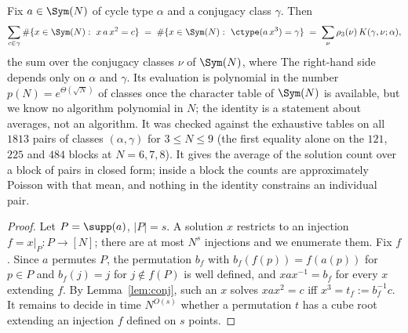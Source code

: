\begin{thm}\label{thm:firstmoment}\label{prop:moment}
Fix $a\in\Sym(N)$ of cycle type $\alpha$ and a conjugacy class $\gamma$. Then
\[ \sum_{c\in\gamma}\#\{x\in\Sym(N):\ x\,a\,x^{2}=c\}\;=\;\#\{x\in\Sym(N):\ \ctype(a\,x^{3})=\gamma\}\;=\;\sum_{\nu}\rho_3(\nu)\,K(\gamma,\nu;\alpha), \]
the sum over the conjugacy classes $\nu$ of $\Sym(N)$, where
The right-hand side depends only on $\alpha$ and $\gamma$. Its evaluation is polynomial in the number $p(N)=e^{\Theta(\sqrt N)}$ of
classes once the character table of $\Sym(N)$ is available, but we know no algorithm polynomial in $N$; the identity is a statement about
averages, not an algorithm. It was checked against the exhaustive tables on all $1813$ pairs of classes $(\alpha,\gamma)$ for $3\le N\le9$
(the first equality alone on the $121$, $225$ and $484$ blocks at $N=6,7,8$). It gives the average of the solution count over a block of
pairs in closed form; inside a block the counts are approximately Poisson with that mean, and nothing in the identity constrains an
individual pair.

\begin{proof}
Let $P=\supp(a)$, $|P|=s$. A solution $x$ restricts to an injection $f=x|_P\colon P\to[N]$; there are at most $N^{s}$ injections and we
enumerate them. Fix $f$. Since $a$ permutes $P$, the permutation $b_f$ with $b_f(f(p))=f(a(p))$ for $p\in P$ and $b_f(j)=j$ for
$j\notin f(P)$ is well defined, and $xax^{-1}=b_f$ for every $x$ extending $f$. By Lemma~\ref{lem:conj}, such an $x$ solves $xax^{2}=c$ iff
$x^{3}=t_f:=b_f^{-1}c$. It remains to decide in time $N^{O(s)}$ whether a permutation $t$ has a cube root extending an injection $f$
defined on $s$ points.


\end{proof}
\end{thm}
